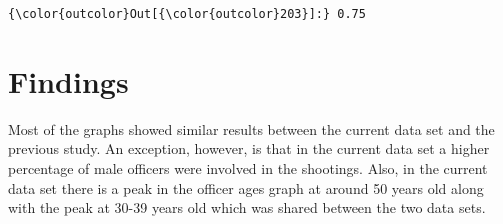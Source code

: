 \documentclass[11pt]{article}
\begin{document}
\begin{Verbatim}[commandchars=\\\{\}]
{\color{outcolor}Out[{\color{outcolor}203}]:} 0.75
\end{Verbatim}
            
    \section{Findings}\label{findings}

    Most of the graphs showed similar results between the current data set
and the previous study. An exception, however, is that in the current
data set a higher percentage of male officers were involved in the
shootings. Also, in the current data set there is a peak in the officer
ages graph at around 50 years old along with the peak at 30-39 years old
which was shared between the two data sets.


    
    
    
    
\end{document}
